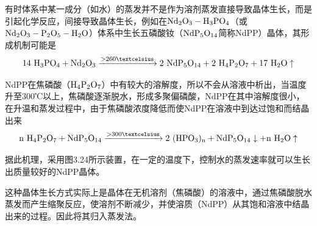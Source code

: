有时体系中某一成分（如水）的蒸发并不是作为溶剂蒸发直接导致晶体生长，而是引起化学反应，间接导致晶体生长，例如在$\rm Nd_2O_3-H_3PO_4$（或$\rm Nd_2O_3-P_2O_5-H_2O$）体系中生长五磷酸钕（$\rm NdP_5O_{14}$简称NdPP）晶体，其形成机制可能是
$$ \rm 14\ H_3PO_4 + Nd_2O_3 \xrightarrow{>260℃} 2\ NdP_5O_{14}+2\ H_4P_2O_7+17\ H_2O\uparrow$$

NdPP在焦磷酸（$\rm H_4P_2O_7$）中有较大的溶解度，所以不会从溶液中析出，当温度升至300℃以上，焦磷酸逐渐脱水，形成多聚偏磷酸，NdPP在其中溶解度很小，在升温和蒸发过程中，由于焦磷酸浓度降低而使NdPP在溶液中到达过饱和而结晶出来
$$\rm n\ H_4P_2O_7 + NdP_5O_{14} \xrightarrow{>300℃} 2\ (HPO_3)_n + NdP_5O_{14}\downarrow + n\ H_2O\uparrow $$

据此机理，采用图3.24所示装置，在一定的温度下，控制水的蒸发速率就可以生长出质量较好的NdPP晶体。

这种晶体生长方式实际上是晶体在无机溶剂（焦磷酸）的溶液中，通过焦磷酸脱水蒸发而产生缩聚反应，使溶剂不断减少，并使溶质（NdPP）从其饱和溶液中结晶出来的过程。因此将其归入蒸发法。